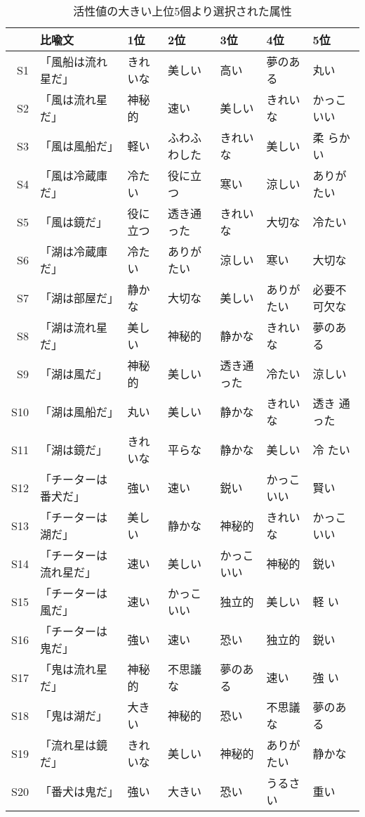 \begin{table}[tb] 
\caption{活性値の大きい上位5個より選択された属性}
\label{tbl:hyo8}
\begin{center}
\begin{small}
\hspace{-0.3cm}\begin{tabular}{|rl|lllll|}
  \hline
  & 比喩文  & 1位  & 2位 & 3位  & 4位  & 5位  \\
  \hline\hline
  S1 & 「風船は流れ星だ」   & きれいな& 美しい& 高い & 夢のある
& 丸い \\\hline
  S2 & 「風は流れ星だ」     & 神秘的& 速い& 美しい& きれいな
& かっこいい \\\hline
  S3 & 「風は風船だ」       & 軽い& ふわふわした& きれいな& 美しい& 柔
らかい \\\hline
  S4 & 「風は冷蔵庫だ」     & 冷たい& 役に立つ & 寒い& 涼しい& ありがたい \\\hline
  S5 & 「風は鏡だ」         & 役に立つ& 透き通った& きれいな & 大切な & 冷たい \\\hline
  S6 & 「湖は冷蔵庫だ」     & 冷たい& ありがたい & 涼しい & 寒い & 大切な \\\hline
  S7 & 「湖は部屋だ」       & 静かな & 大切な & 美しい & ありがたい & 必要不可欠な \\\hline
  S8 & 「湖は流れ星だ」     & 美しい & 神秘的 & 静かな  & きれいな & 
夢のある \\\hline
  S9 & 「湖は風だ」         & 神秘的 & 美しい & 透き通った & 冷たい & 涼しい \\\hline
 S10 & 「湖は風船だ」       & 丸い & 美しい & 静かな & きれいな & 透き
通った \\\hline
 S11 & 「湖は鏡だ」         & きれいな & 平らな & 静かな & 美しい & 冷
たい \\\hline
 S12 & 「チーターは番犬だ」 & 強い & 速い & 鋭い & かっこいい & 賢い \\\hline
 S13 & 「チーターは湖だ」     & 美しい & 静かな & 神秘的 & きれいな & かっこいい \\\hline
 S14 & 「チーターは流れ星だ」 & 速い & 美しい & かっこいい & 神秘的 & 
鋭い \\\hline
 S15 & 「チーターは風だ」   & 速い & かっこいい & 独立的 & 美しい & 軽
い \\\hline
 S16 & 「チーターは鬼だ」   & 強い & 速い & 恐い & 独立的 & 鋭い \\\hline
 S17 & 「鬼は流れ星だ」     & 神秘的 & 不思議な & 夢のある & 速い & 強
い \\\hline
 S18 & 「鬼は湖だ」         & 大きい & 神秘的 & 恐い & 不思議な & 夢のある \\\hline
 S19 & 「流れ星は鏡だ」     & きれいな & 美しい & 神秘的 & ありがたい 
& 静かな  \\\hline
 S20 & 「番犬は鬼だ」       & 強い & 大きい & 恐い & うるさい & 重い \\\hline
\end{tabular}
\end{small}
\end{center}
\end{table}



